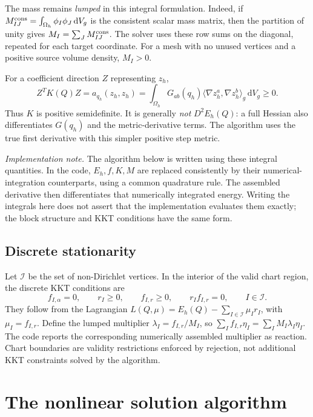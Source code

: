 \documentclass[11pt,a4paper]{article}
\newcommand{\dd}{\,\mathrm d}
\newcommand{\ip}[2]{\langle #1,#2\rangle_g}
\newcommand{\free}{\mathcal I}
\begin{document}
The mass remains \emph{lumped} in this integral formulation. Indeed, if
\(M^{\rm cons}_{IJ}=\int_{\Omega_h}\phi_I\phi_J\dd V_g\) is the consistent
scalar mass matrix, then the partition of unity gives
\(M_I=\sum_J M^{\rm cons}_{IJ}\). The solver uses these row sums on the
diagonal, repeated for each target coordinate. For a mesh with no unused
vertices and a positive source volume density, \(M_I>0\).

For a coefficient direction \(Z\) representing \(z_h\),
\begin{equation}
 Z^TK(Q)Z=a_{q_h}(z_h,z_h)
 =\int_{\Omega_h}G_{ab}(q_h)
       \ip{\nabla z_h^a}{\nabla z_h^b}\dd V_g\geq0.
\end{equation}
Thus \(K\) is positive semidefinite. It is generally \emph{not}
\(D^2E_h(Q)\): a full Hessian also differentiates \(G(q_h)\) and the
metric-derivative terms. The algorithm uses the true first derivative
with this simpler positive step metric.

\textit{Implementation note.}
The algorithm below is written using these integral quantities. In the
code, \(E_h,f,K,M\) are replaced consistently by their numerical-integration
counterparts, using a common quadrature rule. The assembled derivative
then differentiates that numerically integrated energy. Writing the
integrals here does not assert that the implementation evaluates them
exactly; the block structure and KKT conditions have the same form.

\subsection{Discrete stationarity}
Let \(\free\) be the set of non-Dirichlet vertices. In the interior of the
valid chart region, the discrete KKT conditions are
\begin{equation}
 f_{I,\alpha}=0,\qquad
 r_I\geq0,\qquad f_{I,r}\geq0,\qquad r_I f_{I,r}=0,
 \qquad I\in\free.
 \label{eq:discrete-kkt}
\end{equation}
They follow from the Lagrangian
\(L(Q,\mu)=E_h(Q)-\sum_{I\in\free}\mu_I r_I\), with
\(\mu_I=f_{I,r}\). Define the lumped multiplier
\(\lambda_I=f_{I,r}/M_I\), so
\(\sum_I f_{I,r}\eta_I=\sum_I M_I\lambda_I\eta_I\).
The code reports the corresponding numerically assembled multiplier as
reaction. Chart boundaries
are validity restrictions enforced by rejection, not additional KKT
constraints solved by the algorithm.

\section{The nonlinear solution algorithm}
\label{sec:algorithm}
\end{document}
